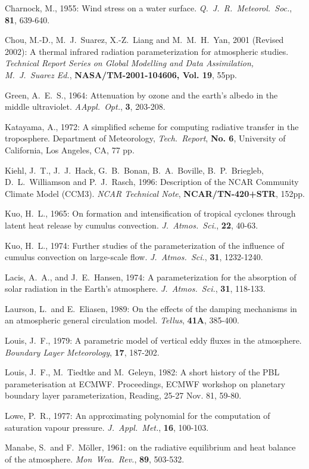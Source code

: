 Charnock, M., 1955: Wind stress on a water surface.
{\it Q.~J.~R.~Meteorol.~Soc.}, {\bf
81}, 639-640.

Chou, M.-D.,  M.~J.~Suarez, X.-Z.~Liang and M.~M.~H.~Yan, 2001 (Revised 2002):
A thermal infrared radiation
parameterization for atmospheric studies. {\it Technical Report Series on Global Modelling and
Data Assimilation, M.~J.~Suarez Ed.}, {\bf NASA/TM-2001-104606, Vol.
19}, 55pp.

Green, A.~E.~S., 1964: Attenuation by ozone and the earth's albedo in the middle ultraviolet.
{\it AAppl.~Opt.}, {\bf 3}, 203-208.

Katayama, A., 1972: A simplified scheme for
computing
radiative transfer in the troposphere.
Department
of Meteorology, {\it Tech.~Report}, {\bf No. 6},
University of California, Los Angeles, CA,
77 pp.

Kiehl, J.~T., J.~J.~Hack, G.~B.~Bonan, B.~A.~Boville, B.~P.~Briegleb, D.~L.~Williamson
and
P.~J.~Rasch, 1996: Description of the NCAR Community Climate Model (CCM3). {\it NCAR
Technical Note}, {\bf NCAR/TN-420+STR}, 152pp.

Kuo, H.~L., 1965: On formation and intensification of
tropical cyclones through latent heat
release by cumulus convection. {\it J.~Atmos.~Sci.},
{\bf 22}, 40-63.

Kuo, H.~L., 1974: Further studies of the
parameterization of the influence of cumulus
convection on large-scale flow. {\it J.~Atmos.~Sci.},
{\bf 31}, 1232-1240.

Lacis, A.~A., and J.~E.~Hansen, 1974: A parameterization for the absorption of solar
radiation in the Earth's atmosphere. {\it J.~Atmos.~Sci.}, {\bf 31}, 118-133. 

Laurson, L.~and E.~Eliasen, 1989: On the effects of
the damping mechanisms in an
atmospheric general circulation model. {\it Tellus},
{\bf 41A}, 385-400.

Louis, J.~F., 1979: A parametric model of vertical
eddy fluxes in the atmosphere. {\it
Boundary
Layer Meteorology}, {\bf 17}, 187-202.

Louis, J.~F., M.~Tiedtke and M.~Geleyn, 1982: A
short history of the PBL parameterisation
at
ECMWF. Proceedings, ECMWF workshop on
planetary boundary layer parameterization,
Reading, 25-27 Nov. 81, 59-80. 

Lowe, P.~R., 1977: An approximating polynomial for
the computation of saturation vapour
pressure. {\it J.~Appl.~Met.}, {\bf 16}, 100-103.

Manabe, S.~and F.~M\"oller, 1961: on the radiative
equilibrium and heat balance of the
atmosphere. {\it Mon~Wea.~Rev.}, {\bf 89}, 503-532. 

